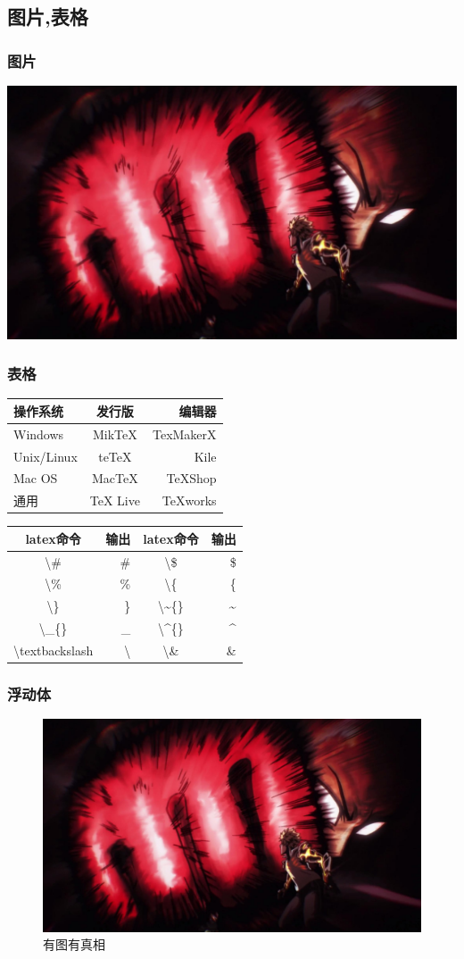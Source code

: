 \documentclass[UTF8]{ctexart}
\begin{document}
\subsection{图片,表格}
\subsubsection{图片}
\includegraphics[width=.5\linewidth]{timg.jpg}

\subsubsection{表格}
\begin{tabular}{|l|c|r|}
	\hline
	操作系统& 发行版& 编辑器\\
	\hline
	Windows & MikTeX & TexMakerX \\
	\hline
	Unix/Linux & teTeX & Kile \\
	\hline
	Mac OS & MacTeX & TeXShop \\
	\hline
	通用& TeX Live & TeXworks \\
	\hline
\end{tabular}
\begin{tabular}{|c|r|c|r|}
	\hline
	latex命令& 输出& latex命令& 输出\\
	\hline
	\textbackslash\# & \# & \textbackslash\$ & \$ \\
	\hline
	\textbackslash\% & \% & \textbackslash\{ & \{ \\
	\hline
	\textbackslash\} & \} & \textbackslash\~{}\{\} & \~{} \\
	\hline
	\textbackslash\_{}\{\} & \_{} & \textbackslash\^{}\{\} & \^{} \\
	\hline
	\textbackslash textbackslash & \textbackslash & \textbackslash\& & \& \\
	\hline
\end{tabular}

\subsubsection{浮动体}
\begin{figure}[htbp]
	\centering
	\includegraphics[width=.3\linewidth]{timg.jpg}
	\caption{有图有真相}
	\label{fig:myphoto}
\end{figure}
\end{document}
